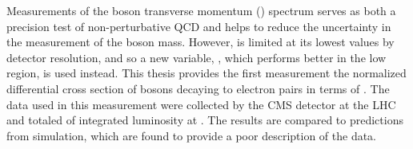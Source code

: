 
Measurements of the \Z boson transverse momentum (\bosonpt) spectrum serves as
both a precision test of non-perturbative QCD and helps to reduce the
uncertainty in the measurement of the \W boson mass. However, \bosonpt is
limited at its lowest values by detector resolution, and so a new variable,
\phistar, which performs better in the low \bosonpt region, is used instead.
This thesis provides the first measurement the normalized differential cross
section of \Z bosons decaying to electron pairs in terms of \phistar. The data
used in this measurement were collected by the CMS detector at the LHC and
totaled \GoodLumiNumber of integrated luminosity at \rootseight.  The results
are compared to predictions from simulation, which are found to provide a poor
description of the data.
